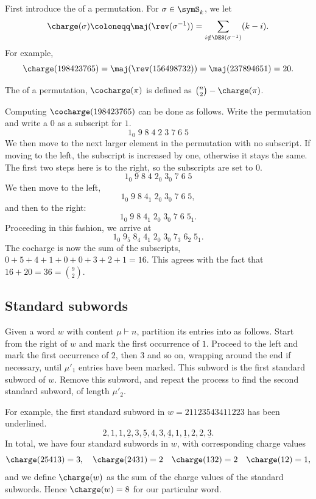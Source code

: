First introduce the \label{chargeStatistic} of a
permutation.
For $\sigma \in \symS_k$, we let
\begin{equation*}
 \charge(\sigma) \coloneqq \maj(\rev(\sigma^{-1})) = 
 \sum_{i \notin \DES(\sigma^{-1})} (k-i).
\end{equation*}
For example, 
\[
\charge(198423765) = \maj(\rev(156498732) ) = \maj(237894651) = 20.
\]

The \label{cochargeStatistic} of a permutation, $\cocharge(\pi)$ is
defined as $\binom{n}{2}-\charge(\pi)$.

\begin{example*}
Computing $\cocharge(198423765)$ can be done as follows.
Write the permutation and write a 0 as a subscript for $1$.
\[
1_0\; 9\; 8\; 4\; 2\; 3\; 7\; 6\; 5
\]
We then move to the next larger element in the permutation with no subscript.
If moving to the left, the subscript is increased by one, otherwise it stays the same.
The first two steps here is to the right, so the subscripts are set to $0$.
\[
1_0\; 9\; 8\; 4\; 2_0\; 3_0\; 7\; 6\; 5
\]
We then move to the left,
\[
1_0\; 9\; 8\; 4_1\; 2_0\; 3_0\; 7\; 6\; 5,
\]
and then to the right:
\[
1_0\; 9\; 8\; 4_1\; 2_0\; 3_0\; 7\; 6\; 5_1.
\]
Proceeding in this fashion, we arrive at
\[
1_0\; 9_5\; 8_4\; 4_1\; 2_0\; 3_0\; 7_3\; 6_2\; 5_1.
\]
The cocharge is now the sum of the subscripts, $0+5+4+1+0+0+3+2+1 = 16$.
This agrees with the fact that $16+20 = 36 = \binom{9}{2}$.
\end{example*}



\subsection[standardSubwords]{Standard subwords}

Given a word $w$ with content $\mu \vdash n$,
partition its entries into
\label{standardSubword} as follows.
Start from the right of $w$ and mark the first occurrence of $1$.
Proceed to the left and mark the first occurrence of $2$,
then $3$ and so on, wrapping around the end if necessary,
until $\mu'_1$ entries have been marked.
This subword is the first standard subword of $w$.
Remove this subword, and repeat the process to find the second standard subword,
of length $\mu'_2$.

For example, the first standard subword in $w = 2 1 1 2 3 5 4 3 4 1 1 2 2 3$
has been underlined.
\[
2, 1, 1, \underline{2}, 3, \underline{5}, 4, 3, \underline{4}, 1, \underline{1}, 2, 2, \underline{3}.
\]
In total, we have four standard subwords in $w$, with corresponding charge values
\[
 \charge(25413) = 3,\quad 
 \charge(2431)=2 \quad 
 \charge(132)=2  \quad 
 \charge(12) = 1,
\]
and we define $\charge(w)$ as the sum of the charge values of the standard subwords.
Hence  $\charge(w) = 8$ for our particular word.



